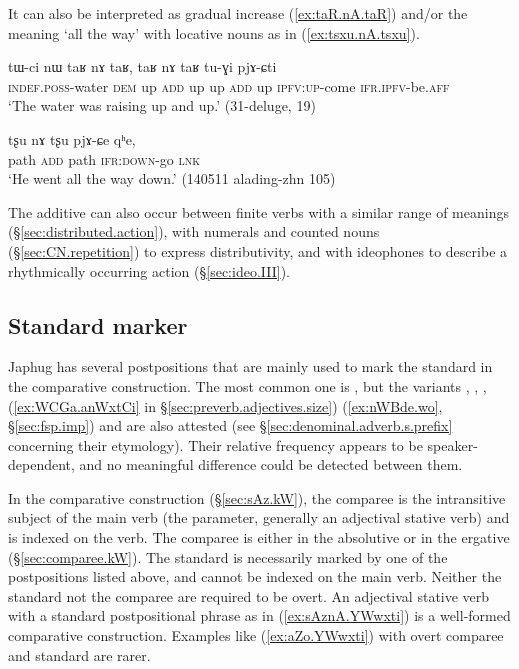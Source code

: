 It can also be interpreted as gradual increase (\ref{ex:taR.nA.taR}) and/or the meaning `all the way' with locative nouns as in (\ref{ex:tsxu.nA.tsxu}).

\begin{exe}
\ex  \label{ex:taR.nA.taR}
\gll tɯ-ci nɯ taʁ nɤ taʁ, taʁ nɤ taʁ tu-ɣi pjɤ-ɕti \\
\textsc{indef}.\textsc{poss}-water  \textsc{dem} up \textsc{add}  up up \textsc{add} up \textsc{ipfv}:\textsc{up}-come \textsc{ifr}.\textsc{ipfv}-be.\textsc{aff} \\
\glt `The water was raising up and up.' (31-deluge, 19)
\end{exe} 

\begin{exe}
\ex  \label{ex:tsxu.nA.tsxu}
\gll  tʂu nɤ tʂu pjɤ-ɕe qʰe, \\
path \textsc{add} path \textsc{ifr}:\textsc{down}-go \textsc{lnk} \\
\glt `He went all the way down.' (140511 alading-zhn 105)
\end{exe} 

The additive can also occur between finite verbs with a similar range of meanings (§\ref{sec:distributed.action}), with numerals and counted nouns (§\ref{sec:CN.repetition}) to express distributivity, and with ideophones to describe a rhythmically occurring action (§\ref{sec:ideo.III}).

\subsection{Standard marker} \label{sec:comparative} 
Japhug has several postpositions that are mainly used to mark the standard in the comparative construction. The most common one is , but the variants , , ,  (\ref{ex:WCGa.anWxtCi} in §\ref{sec:preverb.adjectives.size})   (\ref{ex:nWBde.wo}, §\ref{sec:fsp.imp}) and  are also attested (see §\ref{sec:denominal.adverb.s.prefix} concerning their etymology). Their relative frequency appears to be speaker-dependent, and no meaningful difference could be detected between them. 

In the comparative construction (§\ref{sec:sAz.kW}), the comparee is the intransitive subject of the main verb (the parameter, generally an adjectival stative verb) and is indexed on the verb. The comparee is either in the absolutive or in the ergative (§\ref{sec:comparee.kW}). The standard is necessarily marked by one of the postpositions listed above, and cannot be indexed on the main verb. Neither the standard not the comparee are required to be overt. An adjectival stative verb with a standard postpositional phrase as in  (\ref{ex:sAznA.YWwxti})  is a well-formed comparative construction. Examples like (\ref{ex:aZo.YWwxti}) with overt comparee and standard are rarer.


